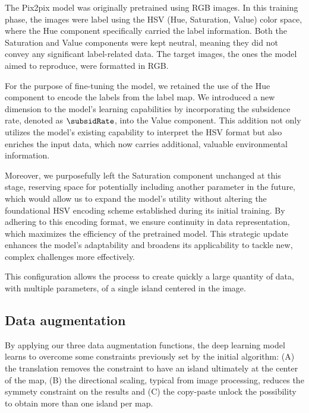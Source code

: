 \documentclass{egpubl}
\begin{document}
The Pix2pix model was originally pretrained using RGB images. In this training phase, the images were label using the HSV (Hue, Saturation, Value) color space, where the Hue component specifically carried the label information. Both the Saturation and Value components were kept neutral, meaning they did not convey any significant label-related data. The target images, the ones the model aimed to reproduce, were formatted in RGB.

For the purpose of fine-tuning the model, we retained the use of the Hue component to encode the labels from the label map. We introduced a new dimension to the model's learning capabilities by incorporating the subsidence rate, denoted as $\subsidRate$, into the Value component. This addition not only utilizes the model's existing capability to interpret the HSV format but also enriches the input data, which now carries additional, valuable environmental information.

Moreover, we purposefully left the Saturation component unchanged at this stage, reserving space for potentially including another parameter in the future, which would allow us to expand the model's utility without altering the foundational HSV encoding scheme established during its initial training. By adhering to this encoding format, we ensure continuity in data representation, which maximizes the efficiency of the pretrained model. This strategic update enhances the model's adaptability and broadens its applicability to tackle new, complex challenges more effectively.

This configuration allows the process to create quickly a large quantity of data, with multiple parameters, of a single island centered in the image. 

\subsection{Data augmentation}
\label{sec:coral-island_data-augmentation}

\begin{deferredfigure}
    \caption{By applying our three data augmentation functions, the deep learning model learns to overcome some constraints previously set by the initial algorithm: (A) the translation removes the constraint to have an island ultimately at the center of the map, (B) the directional scaling, typical from image processing, reduces the symmety constraint on the results and (C) the copy-paste unlock the possibility to obtain more than one island per map.}
    \label{fig:coral-island_data-augmentation-examples}
\end{deferredfigure}
\end{document}
